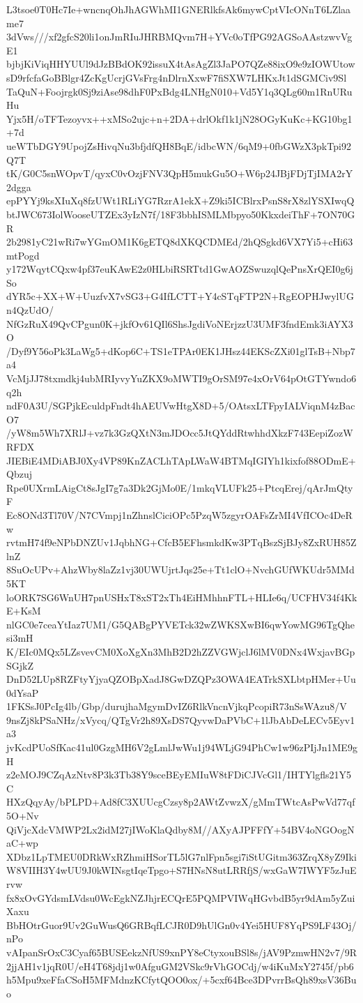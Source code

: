 L3tsoe0T0Hc7Ie+wncnqOhJhAGWhMI1GNERlkfsAk6mywCptVIcONnT6LZlaame7
3dVws///xf2gfcS20li1onJmRIuJHRBMQvm7H+YVc0oTfPG92AGSoAAstzwvVgE1
bjbjKiViqHHYUUl9dJzBBdOK92issuX4tAsAgZl3JaPO7QZe88ixO9e9zIOWUtow
sD9rfcfaGoBBlgr4ZcKgUcrjGVsFrg4nDlrnXxwF7fiSXW7LHKxJt1dSGMCiv9Sl
TaQuN+Foojrgk0Sj9ziAse98dhF0PxBdg4LNHgN010+Vd5Y1q3QLg60m1RnURuHu
Yjx5H/oTFTezoyvx++xMSo2ujc+n+2DA+drlOkf1k1jN28OGyKuKc+KG10bg1+7d
ueWTbDGY9UpojZsHivqNu3bfjdfQH8BqE/idbcWN/6qM9+0fbGWzX3pkTpi92Q7T
tK/G0C5snWOpvT/qyxC0vOzjFNV3QpH5mukGu5O+W6p24JBjFDjTjIMA2rY2dgga
epPYYj9ksXIuXq8fzUWt1RLiYG7RzrA1ekX+Z9ki5ICBlrxPsnS8rX8zlYSXIwqQ
btJWC673IolWooseUTZEx3yIzN7f/18F3bbhISMLMbpyo50KkxdeiThF+7ON70GR
2b2981yC21wRi7wYGmOM1K6gETQ8dXKQCDMEd/2hQSgkd6VX7Yi5+cHi63mtPogd
y172WqytCQxw4pf37euKAwE2z0HLbiRSRTtd1GwAOZSwuzqlQePnsXrQEI0g6jSo
dYR5c+XX+W+UuzfvX7vSG3+G4IfLCTT+Y4cSTqFTP2N+RgEOPHJwylUGn4QzUdO/
NfGzRuX49QvCPgun0K+jkfOv61QIl6ShsJgdiVoNErjzzU3UMF3fndEmk3iAYX3O
/Dyf9Y56oPk3LaWg5+dKop6C+TS1eTPAr0EK1JHsz44EKScZXi01glTsB+Nbp7a4
VcMjJJ78txmdkj4ubMRIyvyYuZKX9oMWTI9gOrSM97e4xOrV64pOtGTYwndo6q2h
ndF0A3U/SGPjkEculdpFndt4hAEUVwHtgX8D+5/OAtsxLTFpyIALViqnM4zBacO7
/yW8m5Wh7XRlJ+vz7k3GzQXtN3mJDOcc5JtQYddRtwhhdXkzF743EepiZozWRFDX
JIEBiE4MDiABJ0Xy4VP89KnZACLhTApLWaW4BTMqIGIYh1kixfof88ODmE+Qbzuj
Rpe0UXrmLAigCt8sJgI7g7a3Dk2GjMo0E/1mkqVLUFk25+PtcqErej/qArJmQtyF
Ec8ONd3Tl70V/N7CVmpj1nZhnslCiciOPc5PzqW5zgyrOAFsZrMI4VfICOc4DeRw
rvtmH74f9eNPbDNZUv1JqbhNG+CfcB5EFhsmkdKw3PTqBszSjBJy8ZxRUH85ZlnZ
8SuOcUPv+AhzWby8laZz1vj30UWUjrtJqs25e+Tt1clO+NvchGUfWKUdr5MMd5KT
loORK7SG6WnUH7pnUSHxT8xST2xTh4EiHMhhnFTL+HLIe6q/UCFHV34f4KkE+KsM
nlGC0e7ceaYtIaz7UM1/G5QABgPYVETck32wZWKSXwBI6qwYowMG96TgQhesi3mH
K/EIc0MQx5LZsvevCM0XoXgXn3MhB2D2hZZVGWjclJ6lMV0DNx4WxjavBGpSGjkZ
DnD52LUp8RZFtyYjyaQZOBpXadJ8GwDZQPz3OWA4EATrkSXLbtpHMer+Uu0dYsaP
1FKSsJ0PcIg4lb/Gbp/durujhaMgymDvIZ6RlkVncnVjkqPcopiR73nSsWAzu8/V
9nsZj8kPSaNHz/xVycq/QTgVr2h89XsDS7QyvwDaPVbC+1lJbAbDeLECv5Eyv1a3
jvKcdPUoSfKac41ul0GzgMH6V2gLmlJwWu1j94WLjG94PhCw1w96zPIjJn1ME9gH
z2eMOJ9CZqAzNtv8P3k3Tb38Y9sceBEyEMIuW8tFDiCJVcGl1/IHTYlgfls21Y5C
HXzQqyAy/bPLPD+Ad8fC3XUUcgCzsy8p2AWtZvwzX/gMmTWtcAsPwVd77qf5O+Nv
QiVjcXdcVMWP2Lx2idM27jIWoKlaQdby8M//AXyAJPFFfY+54BV4oNGOogNaC+wp
XDbz1LpTMEU0DRkWxRZhmiHSorTL5lG7nlFpn5sgi7iStUGitm363ZrqX8yZ9Iki
W8VIIH3Y4wUU9J0kWINsgtIqeTpgo+S7HNsN8utLRRfjS/wxGaW7IWYF5zJuErvw
fx8xOvGYdsmLVdsu0WcEgkNZJhjrECQrE5PQMPVIWqHGvbdB5yr9dAm5yZuiXaxu
BbHOtrGuor9Uv2GuWusQ6GRBqfLCJR0D9hUlGn0v4Yei5HUF8YqPS9LF43Oj/nPo
vAIpanSrOxC3Cyaf65BUSEekzNfUS9xnPY8eCtyxouBSl8s/jAV9PzmwHN2v7/9R
2jjAH1v1jqR0U/eH4T68jdj1w0AfguGM2VSkc9rVhGOCdj/w4iKuMxY2745f/pb6
h5Mpu9xeFfaCSoH5MFMdnzKCfytQOO0ox/+5cxf64Bce3DPvrrBsQh89xsV36Buo
